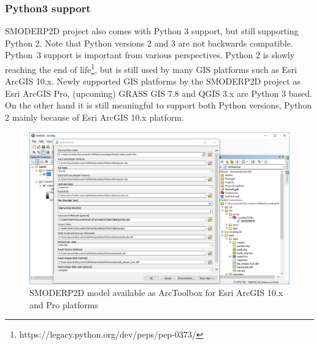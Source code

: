 \subsubsection{Python3 support}
SMODERP2D project also comes with Python 3 support, but still
supporting Python 2. Note that Python versions 2 and 3 are not
backwards compatible.  Python~3 support is important from various
perspectives. Python 2 is slowly reaching the end of
life\footnote{https://legacy.python.org/dev/peps/pep-0373/}, but is still used by many GIS platforms such as Esri ArcGIS 10.x. Newly supported
GIS platforms by the SMODERP2D project as Esri ArcGIS Pro, (upcoming)
GRASS GIS 7.8 and QGIS 3.x are Python 3 based. On the other hand it is
still meaningful to support both Python versions, Python 2 mainly
because of Esri ArcGIS 10.x platform.

\begin{figure}[ht!]
  \begin{center}
    \includegraphics[width=1.0\columnwidth]{figures/smoderp2d_arcgis.png}
    \caption{SMODERP2D model available as ArcToolbox for Esri ArcGIS
      10.x and Pro platforms}
    \label{fig:smoderp2d_arcgis}
  \end{center}
\end{figure}

